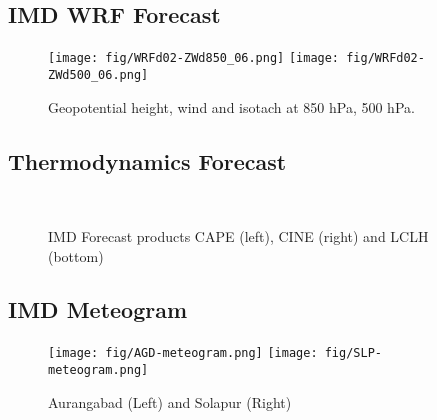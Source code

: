 \documentclass[10pt,usletter]{article} %
\begin{document}


\subsection*{IMD WRF Forecast}

\begin{figure}[H]
\centering
\texttt{[image: fig/WRFd02-ZWd850\_06.png]}
\texttt{[image: fig/WRFd02-ZWd500\_06.png]}
\caption{Geopotential height, wind and isotach at 850 hPa, 500 hPa.}
\end{figure}







\subsection*{Thermodynamics Forecast}%
\begin{figure}[H]
\centering
{} \hskip 0.1cm
%
\\
\vskip 0.1cm
\caption{IMD Forecast products CAPE (left), CINE (right) and  LCLH (bottom)}
\end{figure}




\subsection*{IMD Meteogram}
\begin{figure}[H]
\centering
\texttt{[image: fig/AGD-meteogram.png]}
\texttt{[image: fig/SLP-meteogram.png]}
\caption{Aurangabad (Left) and Solapur (Right)}
\end{figure}
\end{document}
